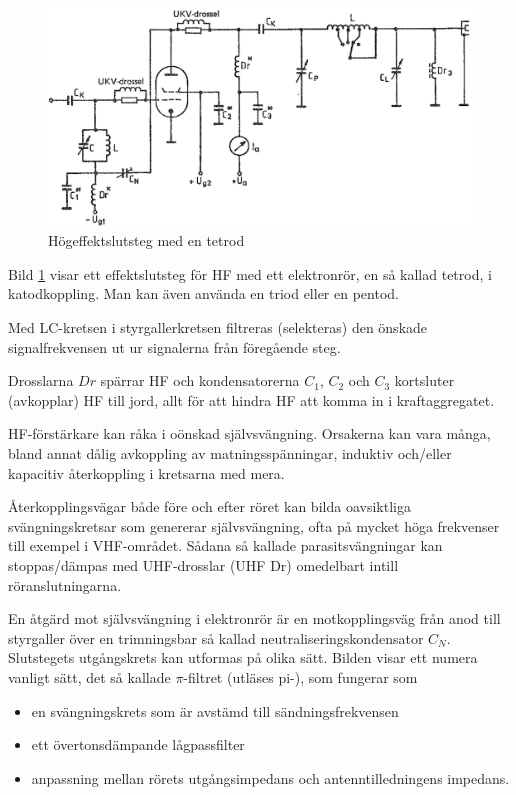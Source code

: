 \begin{figure}
\includegraphics[width=\textwidth]{images/cropped_pdfs/bild_2_3-50.pdf}
\caption{Högeffektslutsteg med en tetrod}
\label{fig:BildII3-50}
\end{figure}

Bild \ref{fig:BildII3-50} visar ett effektslutsteg för HF med ett elektronrör,
en så kallad tetrod, i katodkoppling.
Man kan även använda en triod eller en pentod.

Med LC-kretsen i styrgallerkretsen filtreras (selekteras) den önskade
signalfrekvensen ut ur signalerna från föregående steg.

Drosslarna \(Dr\) spärrar HF och kondensatorerna \(C_1\), \(C_2\) och
\(C_3\) kortsluter (avkopplar) HF till jord,
allt för att hindra HF att komma in i kraftaggregatet.

HF-förstärkare kan råka i oönskad självsvängning.
Orsakerna kan vara många, bland annat dålig avkoppling av matningsspänningar,
induktiv och/eller kapacitiv återkoppling i kretsarna med mera.

Återkopplingsvägar både före och efter röret kan bilda oavsiktliga
svängningskretsar som genererar självsvängning, ofta på mycket höga
frekvenser till exempel i VHF-området.
Sådana så kallade parasitsvängningar kan stoppas/dämpas med UHF-drosslar (UHF
Dr) omedelbart intill röranslutningarna.

En åtgärd mot självsvängning i elektronrör är en motkopplingsväg från anod till
styrgaller över en trimningsbar så kallad neutraliseringskondensator \(C_N\).
Slutstegets utgångskrets kan utformas på olika sätt.
Bilden visar ett numera vanligt sätt, det så kallade \(\pi\)-filtret (utläses
pi-), som fungerar som
\begin{itemize}
  \item en svängningskrets som är avstämd till sändningsfrekvensen
  \item ett övertonsdämpande lågpassfilter
  \item anpassning mellan rörets utgångsimpedans och antenntilledningens impedans.
\end{itemize}

